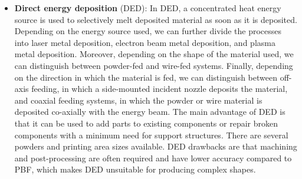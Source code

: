 \begin{itemize}
    \item \textbf{Direct energy deposition} (DED): In DED, a concentrated heat energy source is used to selectively melt deposited material as soon as it is deposited. Depending on the energy source used, we can further divide the processes into laser metal deposition, electron beam metal deposition, and plasma metal deposition. Moreover, depending on the shape of the material used, we can distinguish between powder-fed and wire-fed systems. Finally, depending on the direction in which the material is fed, we can distinguish between off-axis feeding, in which a side-mounted incident nozzle deposits the material, and coaxial feeding systems, in which the powder or wire material is deposited co-axially with the energy beam. The main advantage of DED is that it can be used to add parts to existing components or repair broken components with a minimum need for support structures. There are several powders and printing area sizes available. DED drawbacks are that machining and post-processing are often required and have lower accuracy compared to PBF, which makes DED unsuitable for producing complex shapes.
    \end{itemize}



